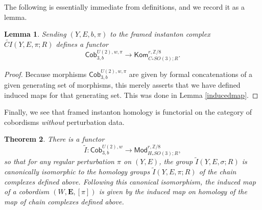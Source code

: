 \documentclass{memo-l}
\newtheorem{theorem}{Theorem}[chapter]
\newtheorem{lemma}[theorem]{Lemma}
\theoremstyle{definition}
\theoremstyle{remark}
\numberwithin{section}{chapter}
\numberwithin{equation}{chapter}
\begin{document}
The following is essentially immediate from definitions, and we record it as a lemma. 

\begin{lemma}\label{framed-functor-broken}Sending $(Y,E,b,\pi)$ to the framed instanton complex $\widetilde{CI}(Y, E, \pi; R)$ defines a functor $$\mathsf{Cob}_{3,b}^{U(2),w,\pi} \to \mathsf{Kom}_{C_*SO(3);R}^{r,\mathbb Z/8}.$$
\end{lemma}
\begin{proof}Because morphisms $\mathsf{Cob}_{3,b}^{U(2),w,\pi}$ are given by formal concatenations of a given generating set of morphisms, this merely asserts that we have defined induced maps for that generating set. This was done in Lemma \ref{inducedmap}. 
\end{proof}

Finally, we see that framed instanton homology is functorial on the category of cobordisms \emph{without} perturbation data.

\begin{theorem}\label{framed-functor}There is a functor $$\widetilde I: \mathsf{Cob}_{3,b}^{U(2),w} \to \mathsf{Mod}_{H_*SO(3);R}^{r,\mathbb Z/8},$$ so that for any regular perturbation $\pi$ on $(Y,E)$, the group $\widetilde I(Y,E,\sigma;R)$ is canonically isomorphic to the homology groups $\widetilde I(Y, E, \pi;R)$ of the chain complexes defined above. Following this canonical isomorphism, the induced map of a cobordism $(W,\mathbf{E},[\pi])$ is given by the induced map on homology of the map of chain complexes defined above.
\end{theorem}
\end{document}
